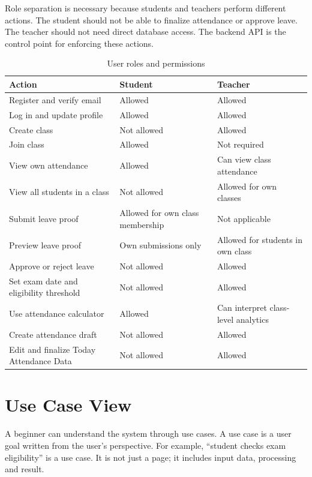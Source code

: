 Role separation is necessary because students and teachers perform different actions. The student should not be able to finalize attendance or approve leave. The teacher should not need direct database access. The backend API is the control point for enforcing these actions.

\begin{table}[H]
\centering
\caption{User roles and permissions}
\label{tab:roles}
\begin{tabularx}{\textwidth}{p{3cm} X X}
\toprule
\textbf{Action} & \textbf{Student} & \textbf{Teacher}\\
\midrule
Register and verify email & Allowed & Allowed\\
Log in and update profile & Allowed & Allowed\\
Create class & Not allowed & Allowed\\
Join class & Allowed & Not required\\
View own attendance & Allowed & Can view class attendance\\
View all students in a class & Not allowed & Allowed for own classes\\
Submit leave proof & Allowed for own class membership & Not applicable\\
Preview leave proof & Own submissions only & Allowed for students in own class\\
Approve or reject leave & Not allowed & Allowed\\
Set exam date and eligibility threshold & Not allowed & Allowed\\
Use attendance calculator & Allowed & Can interpret class-level analytics\\
Create attendance draft & Not allowed & Allowed\\
Edit and finalize Today Attendance Data & Not allowed & Allowed\\
\bottomrule
\end{tabularx}
\end{table}

\section{Use Case View}

A beginner can understand the system through use cases. A use case is a user goal written from the user's perspective. For example, ``student checks exam eligibility'' is a use case. It is not just a page; it includes input data, processing and result.

